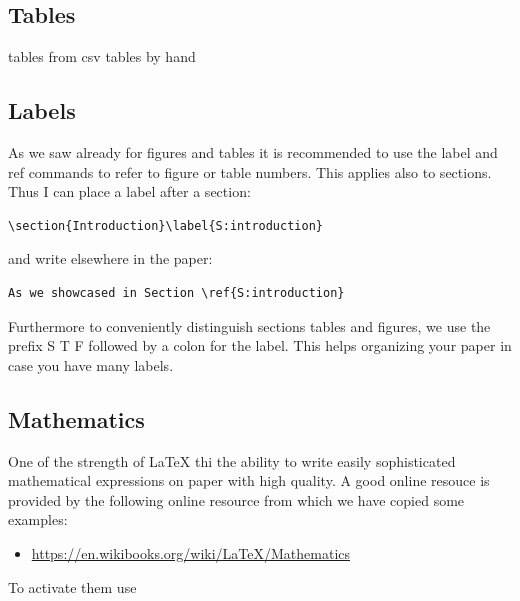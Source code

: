 \subsection{Tables}\label{tables}

tables from csv tables by hand

\subsection{Labels}\label{labels}

As we saw already for figures and tables it is recommended to use the
label and ref commands to refer to figure or table numbers. This applies
also to sections. Thus I can place a label after a section:

\begin{verbatim}
\section{Introduction}\label{S:introduction}
\end{verbatim}

and write elsewhere in the paper:

\begin{verbatim}
As we showcased in Section \ref{S:introduction}
\end{verbatim}

Furthermore to conveniently distinguish sections tables and figures, we
use the prefix S T F followed by a colon for the label. This helps
organizing your paper in case you have many labels.

\subsection{Mathematics}\label{math}

One of the strength of LaTeX thi the ability to write easily
sophisticated mathematical expressions on paper with high quality. A
good online resouce is provided by the following online resource from
which we have copied some examples:

\begin{itemize}

\item
  \url{https://en.wikibooks.org/wiki/LaTeX/Mathematics}
\end{itemize}

To activate them use 

